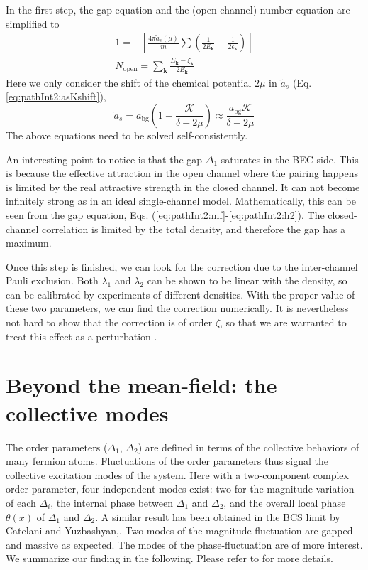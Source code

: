 \documentclass[reprint,pra]{revtex4-1}
\newcommand{\vk}{\ensuremath{\mathbf{k}}}
\newcommand{\nth}[1]{\ensuremath{\frac{1}{#1}}}
\newcommand{\mbr}[1]{\ensuremath{\left[#1\right]}}
\begin{document}
In  the first step, the gap equation and the (open-channel) number equation are simplified to 
\begin{gather}
1=-\mbr{\frac{4\pi{\tilde{a}_{s}(\mu)}}{m}\sum(\nth{2E_{\vk}}-\nth{2\epsilon_{\vk}})}\label{eq:pathInt2:narrowGapS}\\
N_{\text{open}}=\sum_\vk\frac{E_\vk-\xi_\vk}{2E_\vk}\label{eq:pathInt2:narrowNumS}
\end{gather}
Here we only consider the shift of the  chemical potential $2\mu$ in   $\tilde{a}_s$ (Eq. \ref{eq:pathInt2:asKshift}),
\begin{equation}
\tilde{a}_{s}=a_{\text{bg}}(1+\frac{\mathcal{K}}{\delta-2\mu})\approx{}\frac{a_{\text{bg}}\mathcal{K}}{\delta-2\mu}
\label{eq:pathInt2:simplenarrowAs}
\end{equation}
The above equations need to be solved self-consistently. 

 An interesting point  to notice is that the gap $\Delta_1$ saturates in the BEC side. This is because the effective attraction in the open channel where the pairing happens is limited by the real attractive strength in the closed channel.  It can not become  infinitely strong as in an ideal single-channel model.  Mathematically, this can be seen from the gap equation, Eqs. (\ref{eq:pathInt2:mf}-\ref{eq:pathInt2:h2}). The closed-channel correlation is limited by the total density, and therefore the gap has a maximum.  

Once this step is finished, we can look for the correction due to the inter-channel Pauli exclusion.  Both $\lambda_1$ and $\lambda_2$ can be shown  to be linear with the density, so can be calibrated by experiments of different densities.  With the proper value of these two parameters, we can find the correction numerically.  It is nevertheless not hard to show that the correction is of order $\zeta$, so that we are warranted to  treat this effect as a perturbation \cite{Zhuthesis}.


\section{Beyond the mean-field: the collective modes\label{sec:bosonic}}
The order parameters ($\Delta_{1}$, $\Delta_{2}$) are defined in terms of the collective behaviors of many fermion atoms.  Fluctuations of the order parameters thus signal the collective excitation modes of the system. Here with a two-component complex order parameter, four independent modes exist:   two for the magnitude variation of each $\Delta_i$, the internal phase between $\Delta_1$ and $\Delta_2$, and the overall local phase $\theta(x)$ of $\Delta_1$ and $\Delta_2$.  %
A similar result has been obtained in the BCS limit by Catelani and Yuzbashyan,\cite{Catelani}.
Two modes of the magnitude-fluctuation are gapped and massive as expected.  The modes of the phase-fluctuation are  of more interest.
We summarize our finding in the following.  Please refer to \cite{Zhuthesis} for more details.
\end{document}
